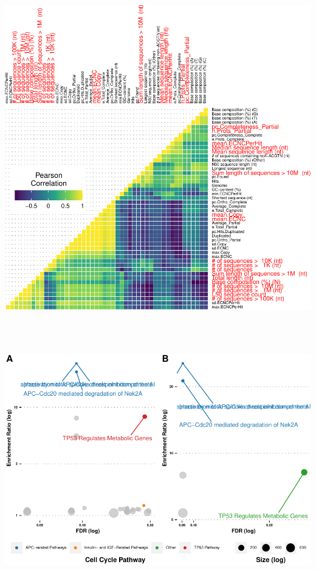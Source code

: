 \documentclass[]{elsarticle} %
\let\origfigure\figure
\let\endorigfigure\endfigure
\renewenvironment{figure}[1][2] {
    \expandafter\origfigure\expandafter[H]
} {
    \endorigfigure
}
\begin{document}
\begin{figure}[H]

{\centering \includegraphics[width=6in,height=6in,]{paper_PLOS_draft_files/figure-latex/Figure-GenomeCor-1} 

}

\caption{Correlations between genome quality metrics and ECNC metrics. Gene copy number metrics, and the genome quality metrics most strongly associated with them, are highlighted in red.}\label{fig:Figure-GenomeCor}
\end{figure}



\begin{figure}[H]
\includegraphics[width=6in,height=4in,]{paper_PLOS_draft_files/figure-latex/Figure-loxAfrORA-1} \caption{Overrepresentation Analysis of Duplicated Genes in Atlantogenata using Reactome Pathways.}\label{fig:Figure-loxAfrORA}
\end{figure}
\end{document}

